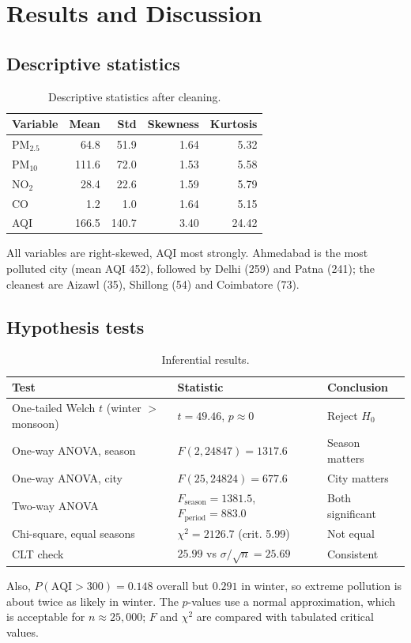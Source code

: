 \documentclass[11pt,a4paper]{article}
\begin{document}
\section{Results and Discussion}
\subsection{Descriptive statistics}
\begin{table}[H]
\centering
\begin{tabular}{@{}lrrrr@{}}
\toprule
Variable & Mean & Std & Skewness & Kurtosis \\ \midrule
PM$_{2.5}$ & 64.8 & 51.9 & 1.64 & 5.32 \\
PM$_{10}$ & 111.6 & 72.0 & 1.53 & 5.58 \\
NO$_2$ & 28.4 & 22.6 & 1.59 & 5.79 \\
CO & 1.2 & 1.0 & 1.64 & 5.15 \\
AQI & 166.5 & 140.7 & 3.40 & 24.42 \\ \bottomrule
\end{tabular}
\caption{Descriptive statistics after cleaning.}
\end{table}
All variables are right-skewed, AQI most strongly. Ahmedabad is the most polluted city (mean AQI 452), followed by Delhi (259) and Patna (241); the cleanest are Aizawl (35), Shillong (54) and Coimbatore (73).

\subsection{Hypothesis tests}
\begin{table}[H]
\centering
\begin{tabular}{@{}lll@{}}
\toprule
Test & Statistic & Conclusion \\ \midrule
One-tailed Welch $t$ (winter $>$ monsoon) & $t=49.46$, $p\approx0$ & Reject $H_0$ \\
One-way ANOVA, season & $F(2,24847)=1317.6$ & Season matters \\
One-way ANOVA, city & $F(25,24824)=677.6$ & City matters \\
Two-way ANOVA & $F_{\text{season}}=1381.5$, $F_{\text{period}}=883.0$ & Both significant \\
Chi-square, equal seasons & $\chi^2=2126.7$ (crit. 5.99) & Not equal \\
CLT check & $25.99$ vs $\sigma/\sqrt{n}=25.69$ & Consistent \\ \bottomrule
\end{tabular}
\caption{Inferential results.}
\end{table}
Also, $P(\text{AQI}>300)=0.148$ overall but $0.291$ in winter, so extreme pollution is about twice as likely in winter. The $p$-values use a normal approximation, which is acceptable for $n\approx 25{,}000$; $F$ and $\chi^2$ are compared with tabulated critical values.
\end{document}

